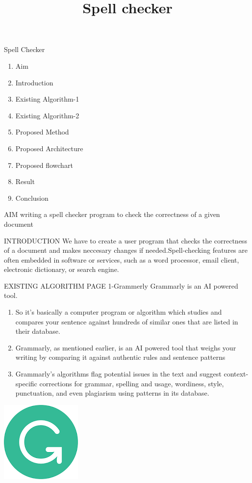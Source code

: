 \documentclass{beamer}
\begin{document}
\begin{frame}{Spell Checker}
\title{Spell checker}
\begin{enumerate}
\item Aim
\item Introduction
\item Existing Algorithm-1
\item Existing Algorithm-2
\item Proposed Method
\item Proposed Architecture
\item Proposed flowchart
\item Result
\item Conclusion
\end{enumerate}
\end{frame}
\begin{frame}{AIM}
writing a spell checker program to check the correctness of a given document
\end{frame}
\begin{frame}{INTRODUCTION}
We have to create a user program that checks the correctness of a document and makes neccesary changes if needed.Spell-checking features are often embedded in software or services, such as a word processor, email client, electronic dictionary, or search engine. 
\end{frame}
\begin{frame}{EXISTING ALGORITHM PAGE 1-Grammerly}
 Grammarly is an AI powered tool.
 \begin{enumerate}
 
 

\item So it’s basically a computer program or algorithm  which studies and compares your sentence against hundreds of similar ones that are listed in their database.
\item Grammarly, as mentioned earlier, is an AI powered tool that weighs your writing by comparing it against authentic rules and sentence patterns
\item Grammarly’s algorithms flag potential issues in the text and suggest context-specific corrections for grammar, spelling and usage, wordiness, style, punctuation, and even plagiarism using patterns in its database.

\end{enumerate}

\end{frame}
\begin{frame}
\includegraphics[scale=0.5]{grammer.png} 
\end{frame}
\end{document}
